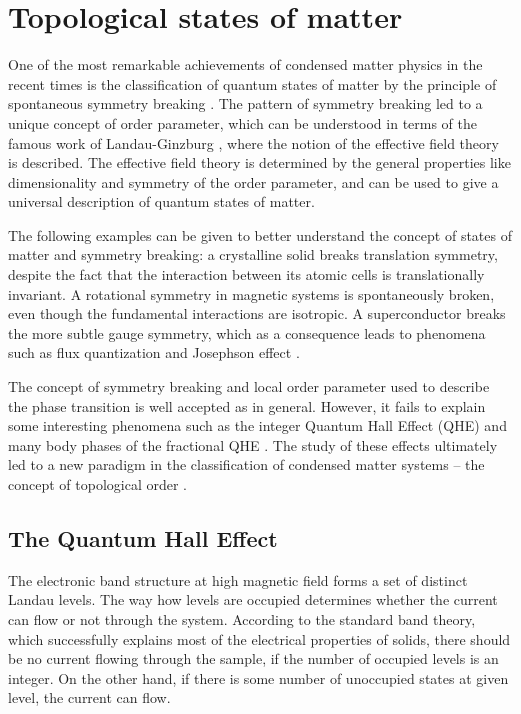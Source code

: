 \documentclass[titlepage,a4paper]{book}
\newcommand{\wciecie}{\quad\phantom{v}}
\begin{document}
\section{Topological states of matter}
\wciecie
One of the most remarkable achievements of condensed matter physics in the recent times is the classification of quantum states of matter by the principle of spontaneous symmetry breaking \cite{Anderson_Topology}. The pattern of symmetry breaking led to a unique concept of order parameter, which can be understood in terms of the famous work of Landau-Ginzburg \cite{Landau_Topology}, where the notion of the effective field theory is described. The effective field theory is determined by the general properties like dimensionality and symmetry of the order parameter, and can be used to give a universal description of quantum states of matter.

The following examples can be given to better understand the concept of states of matter and symmetry breaking: a crystalline solid breaks translation symmetry, despite the fact that the interaction between its atomic cells is translationally invariant. A rotational symmetry in magnetic systems is spontaneously broken, even though the fundamental interactions are isotropic. A superconductor breaks the more subtle gauge symmetry, which as a consequence leads to phenomena such as flux quantization and Josephson effect \cite{Josephson_Topology}.

The concept of symmetry breaking and local order parameter used to describe the phase transition is well accepted as in general. However, it fails to explain some interesting phenomena such as the integer Quantum Hall Effect (QHE) \cite{Klitzing_Topology} and many body phases of the fractional QHE \cite{Tsui_Topology}. The study of these effects ultimately led to a new paradigm in the classification of condensed matter systems -- the concept of topological order \cite{Laughlin_Topology} \cite{Thouless_Topology}.

\subsection{The Quantum Hall Effect}
\wciecie
The electronic band structure at high magnetic field forms a set of distinct Landau levels. The way how levels are occupied determines whether the current can flow or not through the system. According to the standard band theory, which successfully explains most of the electrical properties of solids, there should be no current flowing through the sample, if the number of occupied levels is an integer. On the other hand, if there is some number of unoccupied states at given level, the current can flow. 
\end{document}
